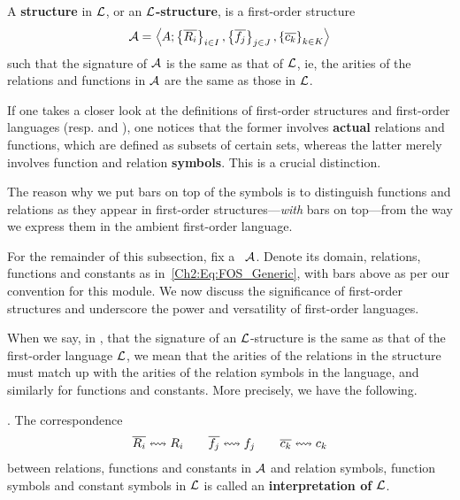 \begin{boxdefinition}\label{Ch2:Def:First-Order_Structure_in_First-Order_Language}
    A \textbf{structure} in $\mathcal{L}$, or an \textbf{$\mathcal{L}$-structure}, is a first-order structure
    \begin{align}
        \mathcal{A} = \left\langle A; \left\{ \overline{R_i} \right\}_{i \in I}, \left\{ \overline{f_j} \right\}_{j \in J}, \left\{ \overline{c_k} \right\}_{k \in K} \right\rangle
        \label{Ch2:Eq:FOS_Generic}
    \end{align}
    such that the signature of $\mathcal{A}$ is the same as that of $\mathcal{L}$, ie, the arities of the relations and functions in $\mathcal{A}$ are the same as those in $\mathcal{L}$.
\end{boxdefinition}

If one takes a closer look at the definitions of first-order structures and first-order languages (resp.  and ), one notices that the former involves \textbf{actual} relations and functions, which are defined as subsets of certain sets, whereas the latter merely involves function and relation \textbf{symbols}. This is a crucial distinction.

\begin{boxconvention}
    The reason why we put bars on top of the symbols is to distinguish functions and relations as they appear in first-order structures---\textit{with} bars on top---from the way we express them in the ambient first-order language.
\end{boxconvention}

For the remainder of this subsection, fix a \fos\ $\mathcal{A}$. Denote its domain, relations, functions and constants as in~\eqref{Ch2:Eq:FOS_Generic}, with bars above as per our convention for this module. We now discuss the significance of first-order structures and underscore the power and versatility of first-order languages.

When we say, in , that the signature of an $\mathcal{L}$-structure is the same as that of the first-order language $\mathcal{L}$, we mean that the arities of the relations in the structure must match up with the arities of the relation symbols in the language, and similarly for functions and constants. More precisely, we have the following.

\begin{boxdefinition}[Interpretation]
    . The correspondence
    \begin{align*}
        \overline{R_i} \leftrightsquigarrow R_i
        \qquad
        \overline{f_j} \leftrightsquigarrow f_j
        \qquad
        \overline{c_k} \leftrightsquigarrow c_k
    \end{align*}
    between relations, functions and constants in $\mathcal{A}$ and relation symbols, function symbols and constant symbols in $\mathcal{L}$ is called an \textbf{interpretation of $\mathcal{L}$}.
\end{boxdefinition}

